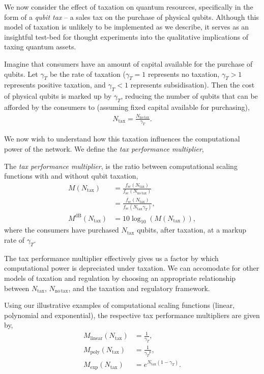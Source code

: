 We now consider the effect of taxation on quantum resources, specifically in the form of a \textit{qubit tax} -- a sales tax on the purchase of physical qubits. Although this model of taxation is unlikely to be implemented as we describe, it serves as an insightful test-bed for thought experiments into the qualitative implications of taxing quantum assets.

Imagine that consumers have an amount of capital available for the purchase of qubits. Let $\gamma_T$ be the rate of taxation (\mbox{$\gamma_T=1$} represents no taxation, \mbox{$\gamma_T>1$} represents positive taxation, and \mbox{$\gamma_T<1$} represents subsidisation). Then the cost of physical qubits is marked up by $\gamma_T$, reducing the number of qubits that can be afforded by the consumers to (assuming fixed capital available for purchasing),
\begin{align}
	N_\mathrm{tax} = \frac{N_\mathrm{no\,tax}}{\gamma_T}.
\end{align}

We now wish to understand how this taxation influences the computational power of the network. We define the \textit{tax performance multiplier},
\begin{definition}
The \textit{tax performance multiplier}, is the ratio between computational scaling functions with and without qubit taxation,
\begin{align}
M(N_\mathrm{tax}) &= \frac{f_\mathrm{sc}(N_\mathrm{tax})}{f_\mathrm{sc}(N_\mathrm{no\,tax})} \nonumber \\
&= \frac{f_\mathrm{sc}(N_\mathrm{tax})}{f_\mathrm{sc}(N_\mathrm{tax} \gamma_T)},\nonumber\\
M^\mathrm{dB}(N_\mathrm{tax}) &= 10\log_{10}(M(N_\mathrm{tax})),
\end{align}
where the consumers have purchased $N_\mathrm{tax}$ qubits, after taxation, at a markup rate of $\gamma_T$.
\end{definition}
The tax performance multiplier effectively gives us a factor by which computational power is depreciated under taxation. We can accomodate for other models of taxation and regulation by choosing an appropriate relationship between $N_\mathrm{tax}$, $N_\mathrm{no\,tax}$, and the taxation and regulatory framework.

Using our illustrative examples of computational scaling functions (linear, polynomial and exponential), the respective tax performance multipliers are given by,
\begin{align}
M_\mathrm{linear}(N_\mathrm{tax}) &= \frac{1}{\gamma_T}, \nonumber \\
M_\mathrm{poly}(N_\mathrm{tax}) &= \frac{1}{{\gamma_T}^p}, \nonumber \\
M_\mathrm{exp} (N_\mathrm{tax}) &= e^{N_\mathrm{tax}(1-\gamma_T)}.
\end{align}

